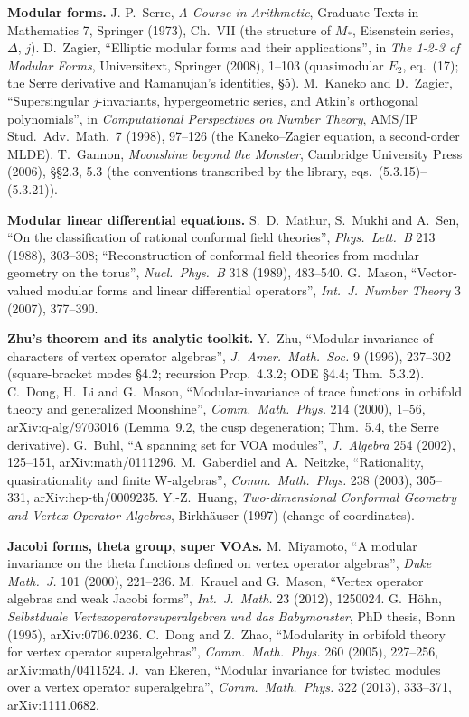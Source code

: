 \textbf{Modular forms.} J.-P.~Serre, \emph{A Course in Arithmetic}, Graduate Texts in Mathematics 7, Springer (1973), Ch.~VII
(the structure of $M_*$, Eisenstein series, $\Delta$, $j$). D.~Zagier, ``Elliptic modular forms and their applications'', in
\emph{The 1-2-3 of Modular Forms}, Universitext, Springer (2008), 1--103 (quasimodular $E_2$, eq.~(17); the Serre derivative and
Ramanujan's identities, §5). M.~Kaneko and D.~Zagier, ``Supersingular $j$-invariants, hypergeometric series, and Atkin's
orthogonal polynomials'', in \emph{Computational Perspectives on Number Theory}, AMS/IP Stud.\ Adv.\ Math.\ 7 (1998), 97--126
(the Kaneko--Zagier equation, a second-order MLDE). T.~Gannon, \emph{Moonshine beyond the Monster}, Cambridge University Press
(2006), §§2.3, 5.3 (the conventions transcribed by the library, eqs.~(5.3.15)--(5.3.21)).

\textbf{Modular linear differential equations.} S.~D.~Mathur, S.~Mukhi and A.~Sen, ``On the classification of rational conformal
field theories'', \emph{Phys.\ Lett.\ B} 213 (1988), 303--308; ``Reconstruction of conformal field theories from modular
geometry on the torus'', \emph{Nucl.\ Phys.\ B} 318 (1989), 483--540. G.~Mason, ``Vector-valued modular forms and linear
differential operators'', \emph{Int.\ J.\ Number Theory} 3 (2007), 377--390.

\textbf{Zhu's theorem and its analytic toolkit.} Y.~Zhu, ``Modular invariance of characters of vertex operator algebras'',
\emph{J.\ Amer.\ Math.\ Soc.} 9 (1996), 237--302 (square-bracket modes §4.2; recursion Prop.~4.3.2; ODE §4.4; Thm.~5.3.2). C.~Dong,
H.~Li and G.~Mason, ``Modular-invariance of trace functions in orbifold theory and generalized Moonshine'', \emph{Comm.\ Math.\
Phys.} 214 (2000), 1--56, arXiv:q-alg/9703016 (Lemma~9.2, the cusp degeneration; Thm.~5.4, the Serre derivative). G.~Buhl, ``A
spanning set for VOA modules'', \emph{J.\ Algebra} 254 (2002), 125--151, arXiv:math/0111296. M.~Gaberdiel and A.~Neitzke,
``Rationality, quasirationality and finite W-algebras'', \emph{Comm.\ Math.\ Phys.} 238 (2003), 305--331, arXiv:hep-th/0009235.
Y.-Z.~Huang, \emph{Two-dimensional Conformal Geometry and Vertex Operator Algebras}, Birkh\"auser (1997) (change of coordinates).

\textbf{Jacobi forms, theta group, super VOAs.} M.~Miyamoto, ``A modular invariance on the theta functions defined on vertex
operator algebras'', \emph{Duke Math.\ J.} 101 (2000), 221--236. M.~Krauel and G.~Mason, ``Vertex operator algebras and weak Jacobi
forms'', \emph{Int.\ J.\ Math.} 23 (2012), 1250024. G.~H\"ohn, \emph{Selbstduale Vertexoperatorsuperalgebren und das
Babymonster}, PhD thesis, Bonn (1995), arXiv:0706.0236. C.~Dong and Z.~Zhao, ``Modularity in orbifold theory for vertex operator
superalgebras'', \emph{Comm.\ Math.\ Phys.} 260 (2005), 227--256, arXiv:math/0411524. J.~van Ekeren, ``Modular invariance for twisted
modules over a vertex operator superalgebra'', \emph{Comm.\ Math.\ Phys.} 322 (2013), 333--371, arXiv:1111.0682.

